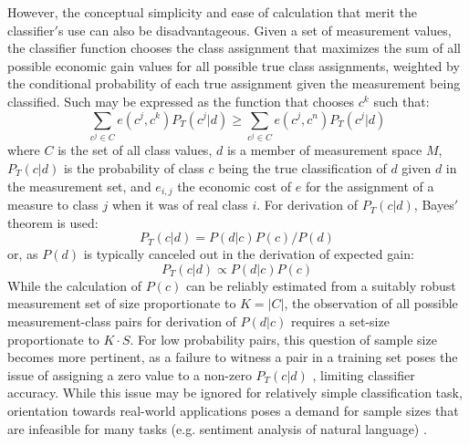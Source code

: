 \documentclass[10pt, conference]{IEEEtran}
\begin{document}
However, the conceptual simplicity and ease of calculation that merit the classifier$'$s use can also be disadvantageous. Given a set of measurement values, the classifier function chooses the class assignment that maximizes the sum of all possible economic gain  values for all possible true class assignments, weighted by the conditional probability of each true assignment given the measurement being classified. Such may be expressed as the function that chooses $c^k$ such that:
\begin{equation}\label{eq:expectedGain}
\sum_{c^j \in C}{e(c^j, c^k)P_T(c^j|d)} \geq \sum_{c^j \in C}{e(c^j,c^n)P_T(c^j|d)} 
\end{equation}
where $C$ is the set of all class values,  $d$ is a member of measurement space $M$, $P_T(c|d)$ is the probability of class $c$ being the true classification of $d$ given $d$ in the measurement set, and $e_{i,j}$  the economic cost of $e$ for the assignment of a measure to class $j$ when it was of real class $i$.  For derivation of $P_T(c|d)$, Bayes$'$ theorem is used:
\begin{equation}
P_T(c|d)=P(d|c)P(c)/P(d)
\end{equation}
or, as $P(d)$ is typically canceled out in the derivation of expected gain:
\begin{equation}\label{eq:BayesNumerator}
P_T(c|d) \propto P(d|c)P(c)
\end{equation}
While the calculation of $P(c)$ can be reliably estimated from a suitably robust measurement set of size proportionate to $K = |C|$, the observation of all possible measurement-class pairs for derivation of $P(d|c)$ requires a set-size proportionate to $K\cdot S$. For low probability pairs, this question of sample size becomes more pertinent, as a failure to witness a pair in a training set poses the issue of assigning a zero value to a non-zero $P_T(c|d)$ \cite{b1}, limiting classifier accuracy. While this issue may be ignored for relatively simple classification task, orientation towards real-world applications poses a demand for sample sizes that are infeasible for many tasks (e.g. sentiment analysis of natural language) \cite{b2}. 
\end{document}
